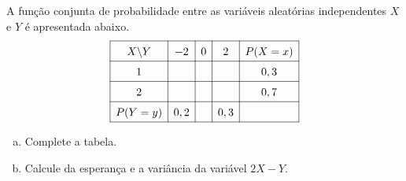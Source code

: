 %
%


\begin{exercicioBanco}[\valorquestao]
    A função conjunta de probabilidade entre as variáveis aleatórias independentes \(X\) e \(Y\) é apresentada abaixo.
    \[
    \renewcommand{\arraystretch}{1.5}
    \begin{array}{|c|c|c|c|c|}
        \hline
        X\backslash Y & -2 & 0 & 2 & P(X = x) \\
        \hline
        1 &  &  &  & 0,3 \\
        \hline
        2 &  &  & & 0,7 \\
        \hline
        P(Y = y) & 0,2 &  & 0,3 & \\
        \hline
    \end{array}
    \]
    \begin{enumerate}[(a)]
        \item Complete a tabela.
        \item Calcule da esperança e a variância da variável \(2X - Y\).
    \end{enumerate}
\end{exercicioBanco}

